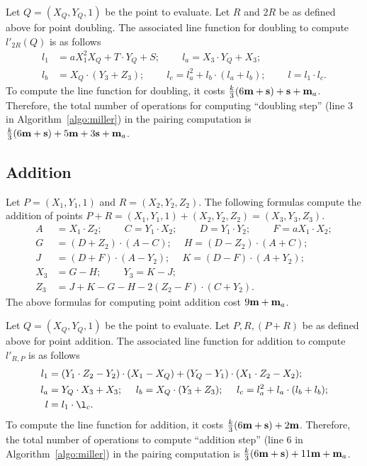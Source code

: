 Let $Q = (X_{Q}, Y_{Q}, 1)$ be the point to evaluate.
Let $R$ and $2R$ be as defined above for point doubling.
The associated line function for doubling
to compute $l'_{2R}(Q)$ is as follows
\begin{align*}
l_1 &= a X_1^2 X_{Q} + T \cdot Y_{Q} + S;\		\qquad
l_a = X_3 \cdot Y_{Q} + X_3;			\\
l_b &= X_{Q} \cdot (Y_3 + Z_3);\			\qquad
l_c = l_a^2 + l_b \cdot (l_a + l_b);\		\qquad
l = l_1 \cdot l_c.
\end{align*}
To compute the line function for doubling,
it costs 
$\frac{k}{3}(6\textbf{m} + \textbf{s}) + \textbf{s} + \textbf{m}_{a}$. %
Therefore, the total number of operations for computing ``doubling step''
({line 3} in Algorithm~\ref{algo:miller}) in the pairing computation is
$\frac{k}{3}(6\textbf{m} + \textbf{s}) + 5\textbf{m} +3\textbf{s} + \textbf{m}_{a}$. %



\subsection{Addition}
Let $P = (X_1,Y_1,1)$ and $R = (X_2,Y_2,Z_2)$.
The following formulas compute the addition of points
$P + R = (X_1,Y_1,1) + (X_2,Y_2,Z_2) = (X_3,Y_3,Z_3)$.
\begin{align*}
A &= X_1 \cdot Z_2;\	\qquad
C = Y_1 \cdot X_2;\	\qquad
D = Y_1 \cdot Y_2;\	\qquad
F = a X_1 \cdot X_2;\\
G &= (D + Z_2) \cdot (A - C);\	\quad
H = (D - Z_2) \cdot (A + C);\\
J &= (D + F) \cdot (A - Y_2);\	\quad
K = (D - F) \cdot (A + Y_2);\\
X_3 &= G - H;\	\qquad
Y_3 = K - J;\\
Z_3 &= J + K - G - H - 2(Z_2 - F) \cdot (C + Y_2).
\end{align*}
The above formulas for computing point addition
cost $9\textbf{m} + \textbf{m}_{a}$. %

Let $Q = (X_{Q},Y_{Q},1)$ be the point to evaluate.
Let $P,R,(P+R)$ be as defined above for point addition.
The associated line function for addition
to compute $l'_{R,P}$ is as follows
\begin{align*}
l_1 &= (Y_1 \cdot Z_2 - Y_2) \cdot (X_1 - X_{Q}) + (Y_{Q} - Y_1) \cdot (X_1 \cdot Z_2 - X_2);\\
l_a &= Y_{Q} \cdot X_3 + X_3;\	\quad
l_b = X_{Q} \cdot (Y_3 + Z_3);\	\quad
l_c = l_a^2 + l_a \cdot (l_b + l_b);\\
l &= l_1 \cdot \l_c.
\end{align*}
To compute the line function for addition,
it costs
$\frac{k}{3}(6\textbf{m} + \textbf{s}) + 2\textbf{m}$. %
Therefore, the total number of operations to compute ``addition step''
({line 6} in Algorithm~\ref{algo:miller}) in the pairing computation is
$\frac{k}{3}(6\textbf{m} + \textbf{s}) + 11\textbf{m} + \textbf{m}_{a}$. %



